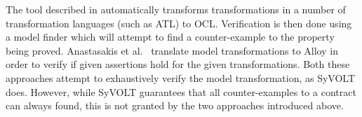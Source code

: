 The tool described in \cite{Buettner2013} automatically transforms
transformations in a number of transformation languages (such as ATL) to OCL. Verification is then
done using a model finder which will attempt to find a counter-example to the
property being proved. Anastasakis et al.~\cite{Anastasakis07}
translate model transformations to Alloy in order to verify if given
assertions hold for the given transformations. Both these
approaches attempt to exhaustively verify the model transformation, as SyVOLT
does. However, while SyVOLT guarantees that all counter-examples to a contract
can always found, this is not granted by the two approaches introduced above.





